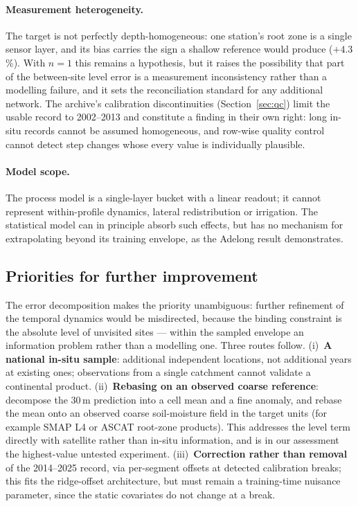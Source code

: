 \documentclass[11pt,a4paper]{article}
\begin{document}
\paragraph{Measurement heterogeneity.} The target is not perfectly
depth-homogeneous: one station's root zone is a single sensor layer, and its
bias carries the sign a shallow reference would produce ($+4.3$\,\%). With
$n = 1$ this remains a hypothesis, but it raises the possibility that part of
the between-site level error is a measurement inconsistency rather than a
modelling failure, and it sets the reconciliation standard for any additional
network. The archive's calibration discontinuities (Section~\ref{sec:qc})
limit the usable record to 2002--2013 and constitute a finding in their own
right: long in-situ records cannot be assumed homogeneous, and row-wise
quality control cannot detect step changes whose every value is individually
plausible.

\paragraph{Model scope.} The process model is a single-layer bucket with a
linear readout; it cannot represent within-profile dynamics, lateral
redistribution or irrigation. The statistical model can in principle absorb
such effects, but has no mechanism for extrapolating beyond its training
envelope, as the Adelong result demonstrates.

\subsection{Priorities for further improvement}\label{sec:headroom}

The error decomposition makes the priority unambiguous: further refinement of
the temporal dynamics would be misdirected, because the binding constraint is
the absolute level of unvisited sites --- within the sampled envelope an
information problem rather than a modelling one. Three routes follow.
(i)~\textbf{A national in-situ sample}: additional independent locations, not
additional years at existing ones; observations from a single catchment cannot
validate a continental product. (ii)~\textbf{Rebasing on an observed coarse
reference}: decompose the 30\,m prediction into a cell mean and a fine
anomaly, and rebase the mean onto an observed coarse soil-moisture field in
the target units (for example SMAP L4 or ASCAT root-zone products). This
addresses the level term directly with satellite rather than in-situ
information, and is in our assessment the highest-value untested experiment.
(iii)~\textbf{Correction rather than removal} of the 2014--2025 record, via
per-segment offsets at detected calibration breaks; this fits the ridge-offset
architecture, but must remain a training-time nuisance parameter, since the
static covariates do not change at a break.
\end{document}
